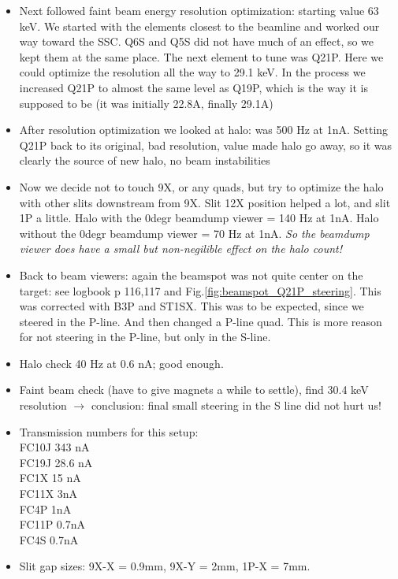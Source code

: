 \documentclass[11pt]{report}
\begin{document}
\begin{enumerate}
\begin{itemize}
  \item Next followed faint beam energy resolution optimization: starting value 63 keV. 
  We started with the elements closest to the beamline and worked our
  way toward the SSC. Q6S and Q5S did not have much of an effect, so we kept them at the
  same place. The next element to tune was Q21P. Here we could 
  optimize the resolution all the way to 29.1 keV. In the process we increased Q21P to almost the same level as Q19P,
  which is the way it is supposed to be (it was initially 22.8A, finally 29.1A)
  \item After resolution optimization we looked at halo: was 500 Hz at 1nA.
  Setting Q21P back to its original, bad resolution, value made halo go away, so it was clearly the source of new halo,
  no beam instabilities
  \item Now we decide not to touch 9X, or any quads, but try to optimize the halo with other slits downstream from 9X.
  Slit 12X position helped a lot, and slit 1P a little. 
  Halo with the 0degr beamdump viewer = 140 Hz at 1nA.
  Halo without the 0degr beamdump viewer = 70 Hz at 1nA. {\it So the beamdump viewer does have a small but non-negilible
  effect on the halo count!}
  \item Back to beam viewers: again the beamspot was not quite center on the target: see logbook p 116,117 
	and Fig.\ref{fig:beamspot_Q21P_steering}.
  This was corrected with B3P and ST1SX.
  This was to be expected, since we steered in the P-line. And then changed a P-line quad. 
  This is more reason for not steering in the P-line, but only in the S-line.
  \item Halo check 40 Hz at 0.6 nA; good enough.
  \item Faint beam check (have to give magnets a while to settle), find 30.4 keV resolution
    $\rightarrow$ conclusion: final small steering in the S line did not hurt us!
  \item Transmission numbers for this setup:\\
    FC10J 343 nA\\
    FC19J 28.6 nA\\
    FC1X  15 nA\\
    FC11X 3nA\\
    FC4P  1nA\\
    FC11P 0.7nA\\
    FC4S 0.7nA
  \item Slit gap sizes: 9X-X = 0.9mm,
                        9X-Y = 2mm,
			1P-X = 7mm.
  \end{itemize}


\end{enumerate}
\end{document}
